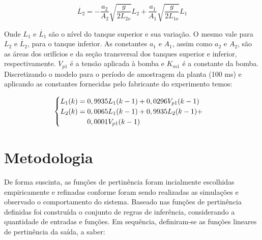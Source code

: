 \documentclass[
	twoside,				%
	twocolumn,				%
	english,				%
	brazil,					%
]{article}
\begin{document}
\begin{equation}
\label{eq:dL2}
\dot{L_{2}} = - \frac{a_{2}}{A_{2}} \sqrt{\frac{g}{2L_{2o}}}L_{2}+\frac{a_{1}}{A_{1}} \sqrt{\frac{g}{2L_{1o}}}L_{1}
\end{equation}

Onde $L_{1}$ e $\dot{L_{1}}$ são o nível do tanque superior e sua variação. O mesmo vale para $L_{2}$ e $\dot{L_{2}}$, para o tanque inferior. As constantes $a_{1}$ e $A_{1}$, assim como $a_{2}$ e $A_{2}$, são as áreas dos orifícios e da seção transversal dos tanques superior e inferior, respectivamente. $V_{p1}$ é a tensão aplicada à bomba e $K_{m1}$ é a constante da bomba. Discretizando o modelo para o período de amostragem da planta (100 ms) e aplicando as constantes fornecidas pelo fabricante do experimento temos:

\begin{equation}
\label{eq:discrete}
\begin{cases}
L_{1}(k) = 0,9935 L_{1}(k-1) + 0,0296V_{p1}(k-1) \\
L_{2}(k) = 0,0065L_{1}(k-1)+0,9935L_{2}(k-1)+ \\ 
\hspace{1.33cm}0,0001V_{p1}(k-1)
\end{cases}
\end{equation}

\section{Metodologia}

De forma suscinta, as funções de pertinência foram incialmente escolhidas empiricamente e refinadas conforme foram sendo realizadas as simulações e observado o comportamento do sistema. Baseado nas funções de pertinência definidas foi construída o conjunto de regras de inferência, considerando a quantidade de entradas e funções. Em sequência, definiram-se as funções lineares de pertinência da saída, a saber:

\end{document}
